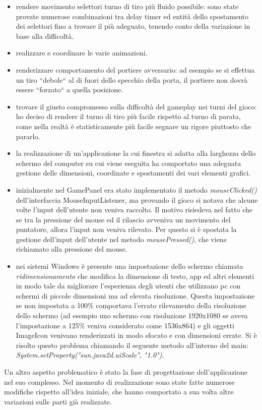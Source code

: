 \documentclass[12pt,a4paper]{report}
\begin{document}
\begin{itemize}
\item rendere movimento selettori turno di tiro più fluido possibile: sono state provate numerose combinazioni tra delay timer ed entità dello spostamento dei selettori fino a trovare il più adeguato, tenendo conto della variazione in base alla difficoltà.
\item realizzare e coordinare le varie animazioni.
\item renderizzare comportamento del portiere avversario: ad esempio se si effettua un tiro ``debole`` al di fuori dello specchio della porta, il portiere non dovrà essere ``forzato`` a quella posizione.
\item trovare il giusto compromesso sulla difficoltà del gameplay nei turni del gioco: ho deciso di rendere il turno di tiro più facile rispetto al turno di parata, come nella realtà è statisticamente più facile segnare un rigore piuttosto che pararlo.
\item la realizzazione di un'applicazione la cui finestra si adatta alla larghezza dello schermo del computer su cui viene eseguita ha comportato una adeguata gestione delle dimensioni, coordinate e spostamenti dei vari elementi grafici.
\item inizialmente nel GamePanel era stato implementato il metodo \emph{mouseClicked()} dell'interfaccia MouseInputListener, ma provando il gioco si notava che alcune volte l'input dell'utente non veniva raccolto. Il motivo risiedeva nel fatto che se tra la pressione del mouse ed il rilascio avveniva un movimento del puntatore, allora l'input non veniva rilevato. Per questo si è spostata la gestione dell'input dell'utente nel metodo \emph{mousePressed()}, che viene richiamato alla pressione del mouse.
\item nei sistemi Windows è presente una impostazione dello schermo chiamata \emph{ridimensionamento} che modifica la dimensione di testo, app ed altri elementi in modo tale da migliorare l'esperienza degli utenti che utilizzano pc con schermi di piccole dimensioni ma ad elevata risoluzione. Questa impostazione se non impostata a 100\% comportava l'errato rilevamento della risoluzione dello schermo (ad esempio uno schermo con risoluzione 1920x1080 se aveva l'impostazione a 125\% veniva considerato come 1536x864) e gli oggetti ImageIcon venivano renderizzati in modo sfocato e con dimensioni errate. Si è risolto questo problema chiamando il seguente metodo all'interno del main: \emph{System.setProperty("sun.java2d.uiScale", "1.0")}.
\end{itemize}
Un altro aspetto problematico è stato la fase di progettazione dell’applicazione nel suo complesso. Nel momento di realizzazione sono state fatte numerose modifiche rispetto all’idea iniziale, che hanno comportato a sua volta altre variazioni sulle parti già realizzate.
\end{document}

